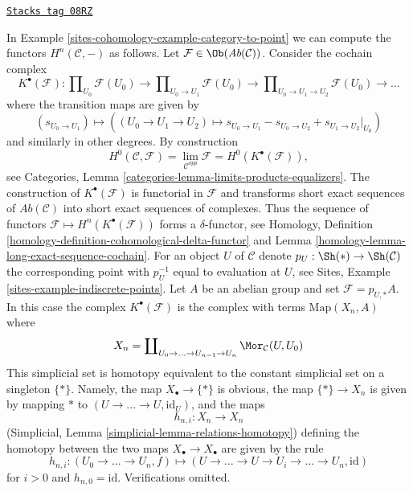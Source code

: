\begin{example}

\label{sites-cohomology-example-right-derived-limits}
\href{https://stacks.math.columbia.edu/tag/08RZ}{\texttt{Stacks tag 08RZ}}

In Example \ref{sites-cohomology-example-category-to-point} we can compute
the functors $H^n(\mathcal{C}, -)$ as follows. Let
$\mathcal{F} \in \Ob(\textit{Ab}(\mathcal{C}))$.
Consider the cochain complex
$$
K^\bullet(\mathcal{F}) :
\prod\nolimits_{U_0} \mathcal{F}(U_0)
\to
\prod\nolimits_{U_0 \to U_1} \mathcal{F}(U_0)
\to
\prod\nolimits_{U_0 \to U_1 \to U_2} \mathcal{F}(U_0)
\to \ldots
$$
where the transition maps are given by
$$
(s_{U_0 \to U_1})
\longmapsto
((U_0 \to U_1 \to U_2) \mapsto s_{U_0 \to U_1} - s_{U_0 \to U_2}
+ s_{U_1 \to U_2}|_{U_0})
$$
and similarly in other degrees. By construction
$$
H^0(\mathcal{C}, \mathcal{F}) =
\lim_{\mathcal{C}^{opp}} \mathcal{F} =
H^0(K^\bullet(\mathcal{F})),
$$
see Categories, Lemma \ref{categories-lemma-limits-products-equalizers}.
The construction of $K^\bullet(\mathcal{F})$ is functorial in $\mathcal{F}$
and transforms short exact sequences of $\textit{Ab}(\mathcal{C})$ into
short exact sequences of complexes. Thus the sequence of functors
$\mathcal{F} \mapsto H^n(K^\bullet(\mathcal{F}))$ forms a $\delta$-functor, see
Homology, Definition \ref{homology-definition-cohomological-delta-functor} and
Lemma \ref{homology-lemma-long-exact-sequence-cochain}.
For an object $U$ of $\mathcal{C}$ denote $p_U : \Sh(*) \to \Sh(\mathcal{C})$
the corresponding point with $p_U^{-1}$ equal to evaluation at $U$, see
Sites, Example \ref{sites-example-indiscrete-points}.
Let $A$ be an abelian group and set $\mathcal{F} = p_{U, *}A$. In this case
the complex $K^\bullet(\mathcal{F})$ is the complex with terms
$\text{Map}(X_n, A)$ where
$$
X_n = \coprod\nolimits_{U_0 \to \ldots \to U_{n - 1} \to U_n}
\Mor_\mathcal{C}(U, U_0)
$$
This simplicial set is homotopy equivalent to the constant simplicial
set on a singleton $\{*\}$. Namely, the map $X_\bullet \to \{*\}$
is obvious, the map $\{*\} \to X_n$ is given
by mapping $*$ to $(U \to \ldots \to U, \text{id}_U)$, and the
maps
$$
h_{n, i} : X_n \longrightarrow X_n
$$
(Simplicial, Lemma \ref{simplicial-lemma-relations-homotopy})
defining the homotopy between the two maps $X_\bullet \to X_\bullet$
are given by the rule
$$
h_{n, i} :
(U_0 \to \ldots \to U_n, f)
\longmapsto
(U \to \ldots \to U \to U_i \to \ldots \to U_n, \text{id})
$$
for $i > 0$ and $h_{n, 0} = \text{id}$. Verifications omitted.

\end{example}
